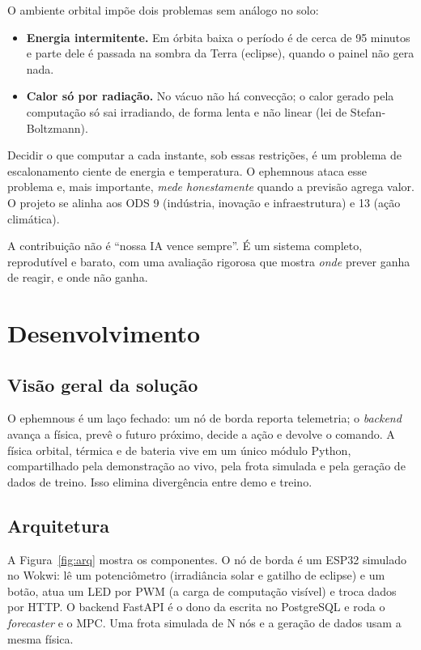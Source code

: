 \documentclass[11pt]{article}
\begin{document}
O ambiente orbital imp\~oe dois problemas sem an\'alogo no solo:

\begin{itemize}
\item \textbf{Energia intermitente.} Em \'orbita baixa o per\'iodo \'e de cerca de 95 minutos e parte dele \'e passada na sombra da Terra (eclipse), quando o painel n\~ao gera nada.
\item \textbf{Calor s\'o por radia\c{c}\~ao.} No v\'acuo n\~ao h\'a convec\c{c}\~ao; o calor gerado pela computa\c{c}\~ao s\'o sai irradiando, de forma lenta e n\~ao linear (lei de Stefan-Boltzmann).
\end{itemize}

Decidir o que computar a cada instante, sob essas restri\c{c}\~oes, \'e um problema de escalonamento ciente de energia e temperatura. O ephemnous ataca esse problema e, mais importante, \emph{mede honestamente} quando a previs\~ao agrega valor. O projeto se alinha aos ODS 9 (ind\'ustria, inova\c{c}\~ao e infraestrutura) e 13 (a\c{c}\~ao clim\'atica).

A contribui\c{c}\~ao n\~ao \'e ``nossa IA vence sempre''. \'E um sistema completo, reprodut\'ivel e barato, com uma avalia\c{c}\~ao rigorosa que mostra \emph{onde} prever ganha de reagir, e onde n\~ao ganha.

\section{Desenvolvimento}

\subsection{Vis\~ao geral da solu\c{c}\~ao}

O ephemnous \'e um la\c{c}o fechado: um n\'o de borda reporta telemetria; o \emph{backend} avan\c{c}a a f\'isica, prev\^e o futuro pr\'oximo, decide a a\c{c}\~ao e devolve o comando. A f\'isica orbital, t\'ermica e de bateria vive em um \'unico m\'odulo Python, compartilhado pela demonstra\c{c}\~ao ao vivo, pela frota simulada e pela gera\c{c}\~ao de dados de treino. Isso elimina diverg\^encia entre demo e treino.

\subsection{Arquitetura}

A Figura~\ref{fig:arq} mostra os componentes. O n\'o de borda \'e um ESP32 simulado no Wokwi: l\^e um potenci\^ometro (irradi\^ancia solar e gatilho de eclipse) e um bot\~ao, atua um LED por PWM (a carga de computa\c{c}\~ao vis\'ivel) e troca dados por HTTP. O backend FastAPI \'e o dono da escrita no PostgreSQL e roda o \emph{forecaster} e o MPC. Uma frota simulada de N n\'os e a gera\c{c}\~ao de dados usam a mesma f\'isica.
\end{document}
